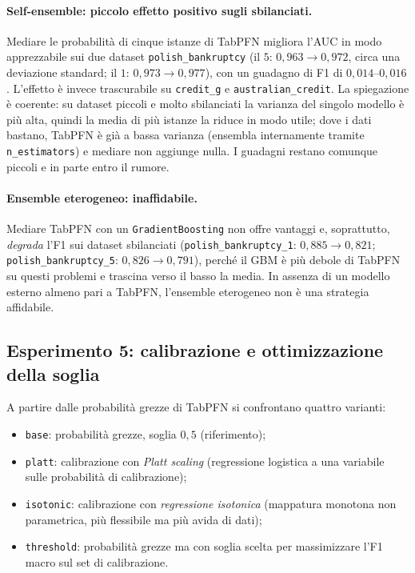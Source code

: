 \documentclass[11pt,a4paper]{article}
\begin{document}
\paragraph{Self-ensemble: piccolo effetto positivo sugli sbilanciati.} Mediare le
probabilità di cinque istanze di TabPFN migliora l'AUC in modo apprezzabile sui
due dataset \texttt{polish\_bankruptcy} (il $5$: $0{,}963 \to 0{,}972$, circa una
deviazione standard; il $1$: $0{,}973 \to 0{,}977$), con un guadagno di F1 di
$0{,}014$--$0{,}016$. L'effetto è invece trascurabile su \texttt{credit\_g} e
\texttt{australian\_credit}. La spiegazione è coerente: su dataset piccoli e molto
sbilanciati la varianza del singolo modello è più alta, quindi la media di più
istanze la riduce in modo utile; dove i dati bastano, TabPFN è già a bassa
varianza (ensembla internamente tramite \texttt{n\_estimators}) e mediare non
aggiunge nulla. I guadagni restano comunque piccoli e in parte entro il rumore.

\paragraph{Ensemble eterogeneo: inaffidabile.} Mediare TabPFN con un
\texttt{GradientBoosting} non offre vantaggi e, soprattutto, \emph{degrada} l'F1
sui dataset sbilanciati (\texttt{polish\_bankruptcy\_1}: $0{,}885 \to 0{,}821$;
\texttt{polish\_bankruptcy\_5}: $0{,}826 \to 0{,}791$), perché il GBM è più debole
di TabPFN su questi problemi e trascina verso il basso la media. In assenza di un
modello esterno almeno pari a TabPFN, l'ensemble eterogeneo non è una strategia
affidabile.

\subsection{Esperimento 5: calibrazione e ottimizzazione della soglia}
\label{sec:exp-calib}
A partire dalle probabilità grezze di TabPFN si confrontano quattro varianti:
\begin{itemize}[nosep]
  \item \texttt{base}: probabilità grezze, soglia $0{,}5$ (riferimento);
  \item \texttt{platt}: calibrazione con \emph{Platt scaling} (regressione
  logistica a una variabile sulle probabilità di calibrazione);
  \item \texttt{isotonic}: calibrazione con \emph{regressione isotonica}
  (mappatura monotona non parametrica, più flessibile ma più avida di dati);
  \item \texttt{threshold}: probabilità grezze ma con soglia scelta per
  massimizzare l'F1 macro sul set di calibrazione.
\end{itemize}
\end{document}

